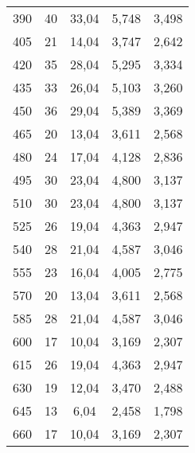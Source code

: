 \begin{table}[H]
\begin{tabular}{| c | c | c  | c| c| }
  390	&   40	&   33,04	  &   5,748	  &   3,498  \\
  405	&   21	&   14,04	  &   3,747	  &   2,642  \\
  420	&   35	&   28,04	  &   5,295	  &   3,334  \\
  435	&   33	&   26,04	  &   5,103	  &   3,260  \\
  450	&   36	&   29,04	  &   5,389	  &   3,369  \\
  465	&   20	&   13,04	  &   3,611	  &   2,568  \\
  480	&   24	&   17,04	  &   4,128	  &   2,836  \\
  495	&   30	&   23,04	  &   4,800	  &   3,137  \\
  510	&   30	&   23,04	  &   4,800	  &   3,137  \\
  525	&   26	&   19,04	  &   4,363	  &   2,947  \\
  540	&   28	&   21,04	  &   4,587	  &   3,046  \\
  555	&   23	&   16,04	  &   4,005	  &   2,775  \\
  570	&   20	&   13,04	  &   3,611	  &   2,568  \\
  585	&   28	&   21,04	  &   4,587	  &   3,046  \\
  600	&   17	&   10,04	  &   3,169	  &   2,307  \\
  615	&   26	&   19,04	  &   4,363	  &   2,947  \\
  630	&   19	&   12,04	  &   3,470	  &   2,488  \\
  645 &	  13  &	   6,04	  &   2,458	  &   1,798  \\
  660	&   17  &	  10,04   &   3,169	  &   2,307  \\
   
    \bottomrule
    \end{tabular}
  \end{table}
  